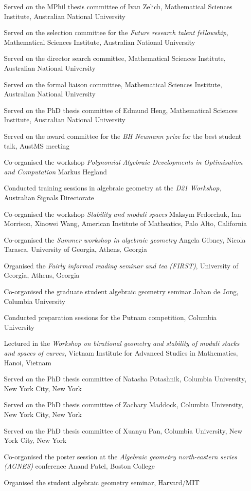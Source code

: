 \documentclass[11pt]{article}
\begin{document}
\begin{description}
Served on the MPhil thesis committee of Ivan Zelich, Mathematical Sciences Institute, Australian National University
\item[{2019}] Served on the selection committee for the \emph{Future research talent fellowship}, Mathematical Sciences Institute, Australian National University

Served on the director search committee, Mathematical Sciences Institute, Australian National University

Served on the formal liaison committee, Mathematical Sciences Institute, Australian National University
\item[{2018}] Served on the PhD thesis committee of Edmund Heng, Mathematical Sciences Institute, Australian National University

Served on the award committee for the \emph{BH Neumann prize} for the best student talk, AustMS meeting

Co-organised the workshop \emph{Polynomial Algebraic Developments in Optimisation and Computation} Markus Hegland

Conducted training sessions in algebraic geometry at the \emph{D21 Workshop}, Australian Signals Directorate
\item[{2017}] Co-organised the workshop \emph{Stability and moduli spaces} Maksym Fedorchuk, Ian Morrison, Xiaowei Wang, American Institute of Matheatics, Palo Alto, California
\item[{2016}] Co-organised the \emph{Summer workshop in algebraic geometry} Angela Gibney, Nicola Tarasca, University of Georgia, Athens, Georgia

Organised the \emph{Fairly informal reading seminar and tea (FIRST)}, University of Georgia, Athens, Georgia

Co-organised the graduate student algebraic geometry seminar Johan de Jong, Columbia University
\item[{2015}] Conducted preparation sessions for the Putnam competition, Columbia University
\item[{2014}] Lectured in the \emph{Workshop on birational geometry and stability of moduli stacks and spaces of curves}, Vietnam Institute for Advanced Studies in Mathematics, Hanoi, Vietnam
\item[{2016}] Served on the PhD thesis committee of Natasha Potashnik, Columbia University, New York City, New York
\item[{2013}] Served on the PhD thesis committee of Zachary Maddock, Columbia University, New York City, New York
\item[{2014}] Served on the PhD thesis committee of Xuanyu Pan, Columbia University, New York City, New York
\item[{2013}] Co-organised the poster session at the \emph{Algebraic geometry north-eastern series (AGNES)} conference Anand Patel, Boston College
\item[{2011, 2010}] Organised the student algebraic geometry seminar, Harvard/MIT
\end{description}
\end{document}

